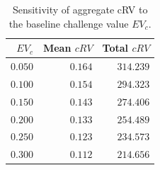 \begin{table}[h]
\centering
\caption{Sensitivity of aggregate cRV to the baseline challenge value $EV_c$.}
\label{tab:evsens}
\small
\begin{tabular}{rrr}
\toprule
$EV_c$ & Mean $cRV$ & Total $cRV$ \\
\midrule
$0.050$ & $0.164$ & $314.239$ \\
$0.100$ & $0.154$ & $294.323$ \\
$0.150$ & $0.143$ & $274.406$ \\
$0.200$ & $0.133$ & $254.489$ \\
$0.250$ & $0.123$ & $234.573$ \\
$0.300$ & $0.112$ & $214.656$ \\
\bottomrule
\end{tabular}
\end{table}
